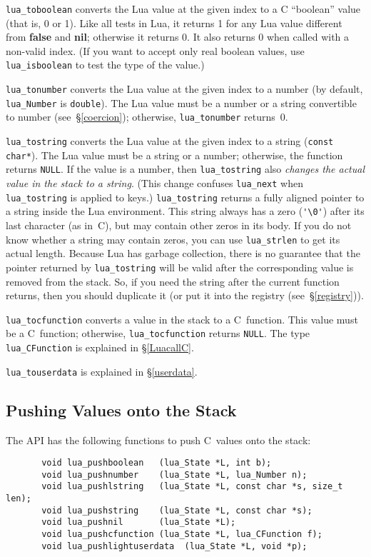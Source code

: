 \documentclass[11pt,twoside,draft]{article}
\makeatletter
\newcommand{\See}[1]{\S\ref{#1}}
\newcommand{\see}[1]{(see~\See{#1})}
\newcommand{\nil}{{\bf nil}}
\newcommand{\False}{{\bf false}}
\newcommand{\DefAPI}[1]{\index{C API!#1@{\tt #1}}}
\makeatother
\begin{document}
\verb|lua_toboolean| converts the Lua value at the given index
to a C ``boolean'' value (that is, 0 or 1).
Like all tests in Lua, it returns 1 for any Lua value different from
\False{} and \nil;
otherwise it returns 0.
It also returns 0 when called with a non-valid index.
(If you want to accept only real boolean values,
use \verb|lua_isboolean| to test the type of the value.)

\verb|lua_tonumber| converts the Lua value at the given index
to a number (by default, \verb|lua_Number| is \verb|double|).
\DefAPI{lua_Number}
The Lua value must be a number or a string convertible to number
\see{coercion}; otherwise, \verb|lua_tonumber| returns~0.

\verb|lua_tostring| converts the Lua value at the given index to a string
(\verb|const char*|).
The Lua value must be a string or a number;
otherwise, the function returns \verb|NULL|.
If the value is a number,
then \verb|lua_tostring| also
\emph{changes the actual value in the stack to a string}.
(This change confuses \verb|lua_next|
when \verb|lua_tostring| is applied to keys.)
\verb|lua_tostring| returns a fully aligned pointer
to a string inside the Lua environment.
This string always has a zero (\verb|'\0'|)
after its last character (as in~C),
but may contain other zeros in its body.
If you do not know whether a string may contain zeros,
you can use \verb|lua_strlen| to get its actual length.
Because Lua has garbage collection,
there is no guarantee that the pointer returned by \verb|lua_tostring|
will be valid after the corresponding value is removed from the stack.
So, if you need the string after the current function returns,
then you should duplicate it (or put it into the registry \see{registry}).

\verb|lua_tocfunction| converts a value in the stack to a C~function.
This value must be a C~function;
otherwise, \verb|lua_tocfunction| returns \verb|NULL|.
The type \verb|lua_CFunction| is explained in \See{LuacallC}.

\verb|lua_touserdata| is explained in \See{userdata}.


\subsection{Pushing Values onto the Stack}

The API has the following functions to
push C~values onto the stack:
\begin{verbatim}
       void lua_pushboolean   (lua_State *L, int b);
       void lua_pushnumber    (lua_State *L, lua_Number n);
       void lua_pushlstring   (lua_State *L, const char *s, size_t len);
       void lua_pushstring    (lua_State *L, const char *s);
       void lua_pushnil       (lua_State *L);
       void lua_pushcfunction (lua_State *L, lua_CFunction f);
       void lua_pushlightuserdata  (lua_State *L, void *p);
\end{verbatim}
\end{document}
